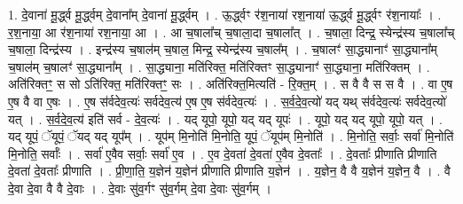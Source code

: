 \documentclass[17pt]{extarticle}
\begin{document}
1. दे॒वाना॑ मू॒र्द्ध्व मू॒र्द्ध्वम् दे॒वाना᳚म् दे॒वाना॑ मू॒र्द्ध्वम् । . ऊ॒र्द्ध्वꣳ र॑श॒नाया॑ रश॒नाया॑ ऊ॒र्द्ध्व मू॒र्द्ध्वꣳ र॑श॒नायाः᳚ । . र॒श॒नाया॒ आ र॑श॒नाया॑ रश॒नाया॒ आ । . आ च॒षाला᳚च् च॒षाला॒दा च॒षाला᳚त् । . च॒षाला॒ दिन्द्र॒ स्येन्द्र॑स्य च॒षाला᳚च् च॒षाला॒ दिन्द्र॑स्य । . इन्द्र॑स्य च॒षाल॑म् च॒षाल॒ मिन्द्र॒ स्येन्द्र॑स्य च॒षाल᳚म् । . च॒षालꣳ॑ सा॒द्ध्यानाꣳ॑ सा॒द्ध्याना᳚म् च॒षाल॑म् च॒षालꣳ॑ सा॒द्ध्याना᳚म् । . सा॒द्ध्याना॒ मति॑रिक्त॒ मति॑रिक्तꣳ सा॒द्ध्यानाꣳ॑ सा॒द्ध्याना॒ मति॑रिक्तम् । . अति॑रिक्तꣳ॒॒ स सो ऽति॑रिक्त॒ मति॑रिक्तꣳ॒॒ सः । . अति॑रिक्त॒मित्यति॑ - रि॒क्त॒म् । . स वै वै स स वै । . वा ए॒ष ए॒ष वै वा ए॒षः । . ए॒ष स॑र्वदेव॒त्यः॑ सर्वदेव॒त्य॑ ए॒ष ए॒ष स॑र्वदेव॒त्यः॑ । . स॒र्व॒दे॒व॒त्यो॑ यद् यथ् स॑र्वदेव॒त्यः॑ सर्वदेव॒त्यो॑ यत् । . स॒र्व॒दे॒व॒त्य॑ इति॑ सर्व - दे॒व॒त्यः॑ । . यद् यूपो॒ यूपो॒ यद् यद् यूपः॑ । . यूपो॒ यद् यद् यूपो॒ यूपो॒ यत् । . यद् यूपं॒ ॅयूपं॒ ॅयद् यद् यूप᳚म् । . यूप॑म् मि॒नोति॑ मि॒नोति॒ यूपं॒ ॅयूप॑म् मि॒नोति॑ । . मि॒नोति॒ सर्वाः॒ सर्वा॑ मि॒नोति॑ मि॒नोति॒ सर्वाः᳚ । . सर्वा॑ ए॒वैव सर्वाः॒ सर्वा॑ ए॒व । . ए॒व दे॒वता॑ दे॒वता॑ ए॒वैव दे॒वताः᳚ । . दे॒वताः᳚ प्रीणाति प्रीणाति दे॒वता॑ दे॒वताः᳚ प्रीणाति । . प्री॒णा॒ति॒ य॒ज्ञेन॑ य॒ज्ञेन॑ प्रीणाति प्रीणाति य॒ज्ञेन॑ । . य॒ज्ञेन॒ वै वै य॒ज्ञेन॑ य॒ज्ञेन॒ वै । . वै दे॒वा दे॒वा वै वै दे॒वाः । . दे॒वाः सु॑व॒र्गꣳ सु॑व॒र्गम् दे॒वा दे॒वाः सु॑व॒र्गम् । \newline
\end{document}
